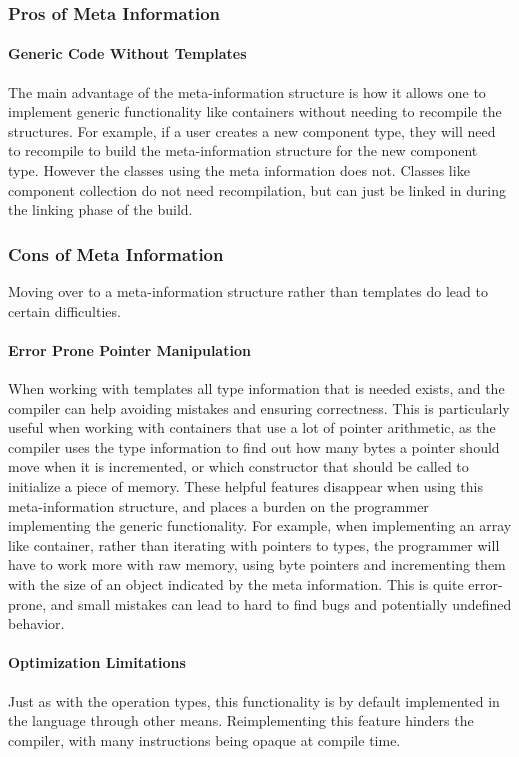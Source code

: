 \subsubsection{Pros of Meta Information}
\paragraph{Generic Code Without Templates}
The main advantage of the meta-information structure is how it allows one to implement
generic functionality like containers without needing to recompile the structures.
For example, if a user creates a new component type, they will need to recompile to build the meta-information structure for the new component type. 
However the classes using the meta information does not. 
Classes like component collection do not need recompilation, but can just be linked in during the linking phase of the build.

\subsubsection{Cons of Meta Information}
Moving over to a meta-information structure rather than templates do lead to certain difficulties.

\paragraph{Error Prone Pointer Manipulation}
When working with templates all type information that is needed exists, and the compiler can help avoiding mistakes and ensuring correctness.
This is particularly useful when working with containers that use a lot of pointer arithmetic, as the compiler uses the type information to find out how many bytes a pointer should move when it is incremented, or which constructor that should be called to initialize a piece of memory.
These helpful features disappear when using this meta-information structure, and places a burden on the programmer implementing the generic functionality.
For example, when implementing an array like container, rather than iterating with pointers to types, the programmer will have to work more with raw memory, using byte pointers and incrementing them with the size of an object indicated by the meta information.
This is quite error-prone, and small mistakes can lead to hard to find bugs and potentially undefined behavior.

\paragraph{Optimization Limitations}
Just as with the operation types, this functionality is by default implemented in the language through other means. 
Reimplementing this feature hinders the compiler, with many instructions being opaque at compile time.

